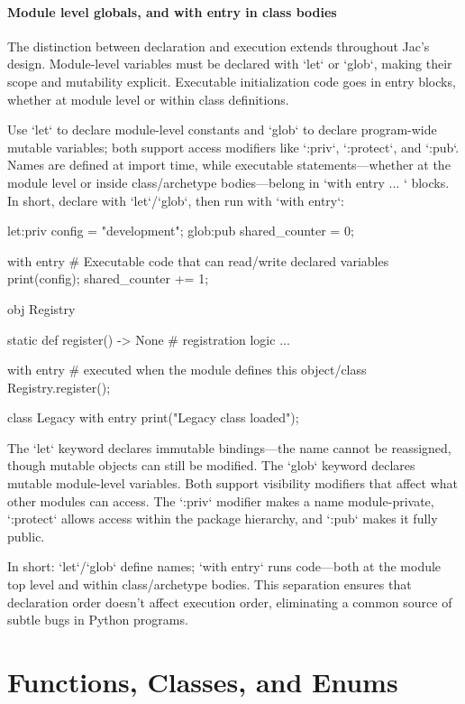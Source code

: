 \paragraph{Module level globals, and with entry in class bodies}

The distinction between declaration and execution extends throughout Jac's design. Module-level variables must be declared with `let` or `glob`, making their scope and mutability explicit. Executable initialization code goes in entry blocks, whether at module level or within class definitions.

Use `let` to declare module-level constants and `glob` to declare program-wide mutable variables; both support access modifiers like `:priv`, `:protect`, and `:pub`. Names are defined at import time, while executable statements—whether at the module level or inside class/archetype bodies—belong in `with entry { ... }` blocks. In short, declare with `let`/`glob`, then run with `with entry`:

\begin{jacblock}
let:priv config = "development";
glob:pub shared_counter = 0;

with entry {
    # Executable code that can read/write declared variables
    print(config);
    shared_counter += 1;
}

obj Registry {
    static def register() -> None {
        # registration logic ...
    }

    with entry {
        # executed when the module defines this object/class
        Registry.register();
    }
}

class Legacy {
    with entry {
        print("Legacy class loaded");
    }
}
\end{jacblock}

The `let` keyword declares immutable bindings—the name cannot be reassigned, though mutable objects can still be modified. The `glob` keyword declares mutable module-level variables. Both support visibility modifiers that affect what other modules can access. The `:priv` modifier makes a name module-private, `:protect` allows access within the package hierarchy, and `:pub` makes it fully public.

In short: `let`/`glob` define names; `with entry` runs code—both at the module top level and within class/archetype bodies. This separation ensures that declaration order doesn't affect execution order, eliminating a common source of subtle bugs in Python programs.

\section{Functions, Classes, and Enums}

